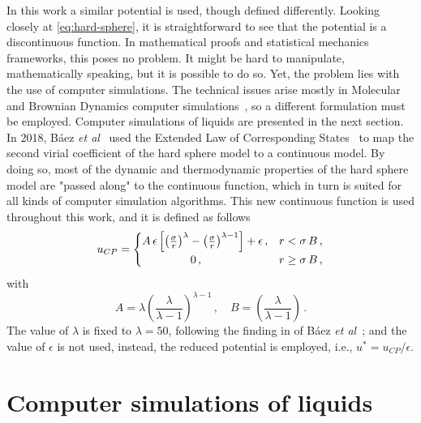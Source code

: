 In this work a similar potential is used, though defined differently. Looking closely
at \autoref{eq:hard-sphere}, it is straightforward to see that the potential is a
discontinuous function. In mathematical proofs and statistical mechanics frameworks,
this poses no problem. It might be hard to manipulate, mathematically speaking,
but it is possible to do so. Yet, the problem lies with the use of computer simulations.
The technical issues arise mostly in Molecular and Brownian Dynamics computer
simulations~\cite{allenComputerSimulationLiquids2017}, so a different formulation
must be employed. Computer simulations of liquids are presented in the next section.
In 2018, Báez \emph{et al}~\cite{baezUsingSecondVirial2018} used the Extended Law
of Corresponding States~\cite{valadez-perezReversibleAggregationColloidal2018}
to map the second virial coefficient of the hard sphere model to a continuous
model. By doing so, most of the dynamic and thermodynamic properties of the hard sphere
model are "passed along" to the continuous function, which in turn is suited for all
kinds of computer simulation algorithms. This new continuous function is used
throughout this work, and it is defined as follows
\begin{equation}
    u_{CP} = 
    \begin{cases}
        A \, \epsilon \left[ {\left(\frac{\sigma}{r}\right)}^{\lambda} -
        {\left(\frac{\sigma}{r}\right)}^{\lambda - 1} \right] + \epsilon \, , 
        &r < \sigma \, B \, , \\
        \hspace{1.5cm} 0 \, , &r \geq \sigma \, B \, ,
    \end{cases}
    \label{eq:cont-hs}
\end{equation}
with
\begin{equation}
    A = \lambda {\left(\frac{\lambda}{\lambda -1}\right)}^{\lambda - 1} \, ,
    \quad
    B = \left(\frac{\lambda}{\lambda -1}\right) \, .
    \label{eq:ab-params}
\end{equation}
The value of $\lambda$ is fixed to $\lambda=50$, following the finding in of
Báez \emph{et al}~\cite{baezUsingSecondVirial2018}; and the value of $\epsilon$ is
not used, instead, the reduced potential is employed, i.e., $u^{*}=u_{CP} / \epsilon$.

\section{Computer simulations of liquids}

